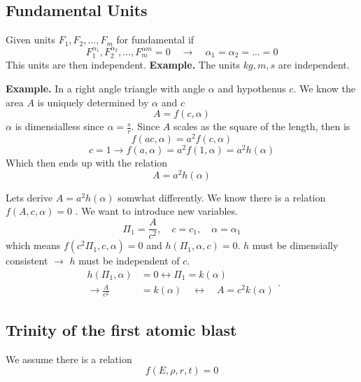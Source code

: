 \documentclass{article}
\theoremstyle{remark}
\begin{document}
\subsection{Fundamental Units}%
\label{sub:fundamental_units}

Given units $F_{1}, F_{2}, \ldots , F_{m}$ for fundamental if \[
  F_{1}^{\alpha_1}, F_{2}^{\alpha_2}, \ldots , F_{m}^{\alpha m} = 0 \quad  \to \quad  \alpha_1 = \alpha_{2} = \ldots = 0   
\] 
This units are then independent.
\textbf{Example.} 
   The units $kg, m, s$ are independent.  

   \textbf{Example.} 
   In a right angle triangle with angle $\alpha $ and hypothenus $c$. We know the area $A$ is uniquely determined by $\alpha $ and $c$ \[
   A = f\left( c,\alpha  \right)
   \] 
   $\alpha $ is dimensialless since  $\alpha  = \frac{s}{r}$. Since $A$ scales as the square of the length, then is \[
   f\left( ac, \alpha  \right) = a^2f\left( c,\alpha  \right)
   \]   
   \[
     c = 1 \to f\left( a, \alpha  \right) = a^2f\left( 1,\alpha  \right) = a^2h\left( \alpha  \right)
   \] 
   Which then ends up with the relation \[
   A = a^2h\left( \alpha  \right)
   \] 



Lets derive $A = a ^2 h\left( \alpha   \right)$ somwhat differently. We know there is a relation $f\left( A, c, \alpha  \right) = 0$ . We want to introduce new variables.\[
\Pi_1 = \frac{A}{c^2}, \quad  c = c_1, \quad \alpha = \alpha _1   
\] 
which means $f\left( c^2 \Pi_1, c, \alpha   \right) = 0$  and $h\left( \Pi_1, \alpha , c \right) = 0$. $h$ must be dimensially consistent $\to$ $h$ must be independent of $c$. 
\begin{equation*}
  \begin{split}
    h\left( \Pi_1, \alpha  \right) &= 0 \leftrightarrow \Pi_1 = k\left( \alpha  \right) \\
    \to  \frac{A}{c^2} &= k\left( \alpha  \right) \quad   \leftrightarrow \quad A = c^2k\left( \alpha  \right) 
  \end{split}
.\end{equation*}

\subsection{Trinity of the first atomic blast}%
\label{sub:trinity_of_the_first_atomic_blast}

We assume there is a relation \[
f\left( E, \rho, r , t \right) = 0
\] 
\end{document}
